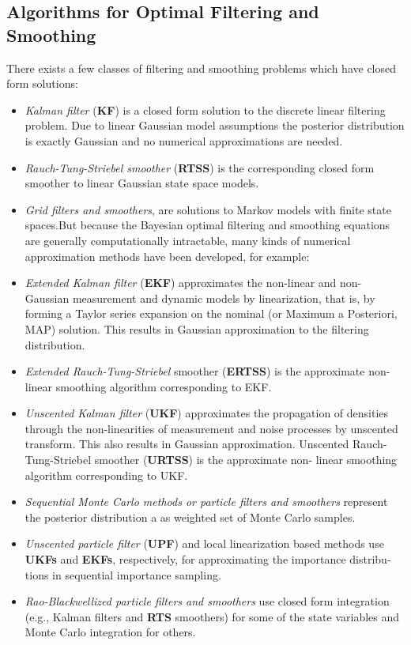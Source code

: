 \documentclass[10pt]{llncs}
\begin{document}
\subsection{Algorithms for Optimal Filtering and Smoothing}
There exists a few classes of filtering and smoothing problems which have closed
form solutions:
\begin{itemize}
\item \textit{Kalman filter} (\textbf{KF}) is a closed form solution to the discrete linear filtering problem. Due to linear Gaussian model assumptions the posterior distribution is exactly Gaussian and no numerical approximations are needed.
\item \textit{Rauch-Tung-Striebel smoother} (\textbf{RTSS}) is the corresponding closed form smoother
to linear Gaussian state space models.
\item \textit{Grid filters and smoothers}, are solutions to Markov models with finite state
spaces.But because the Bayesian optimal filtering and smoothing equations are generally
computationally intractable, many kinds of numerical approximation methods have
been developed, for example:
\item \textit{Extended Kalman filter} (\textbf{EKF}) approximates the non-linear and non-Gaussian
measurement and dynamic models by linearization, that is, by forming a
Taylor series expansion on the nominal (or Maximum a Posteriori, MAP)
solution. This results in Gaussian approximation to the filtering distribution.
\item \textit{Extended Rauch-Tung-Striebel} smoother (\textbf{ERTSS}) is the approximate non-
linear smoothing algorithm corresponding to EKF.
\item \textit{Unscented Kalman filter} (\textbf{UKF}) approximates the propagation of densities through the non-linearities of measurement and noise processes by unscented
transform. This also results in Gaussian approximation.
Unscented Rauch-Tung-Striebel smoother (\textbf{URTSS}) is the approximate non-
linear smoothing algorithm corresponding to UKF.
\item \textit{Sequential Monte Carlo methods or particle filters and smoothers} represent
the posterior distribution a as weighted set of Monte Carlo samples.
\item \textit{ Unscented particle filter} (\textbf{UPF}) and local linearization based methods use
\textbf{UKFs} and \textbf{EKFs}, respectively, for approximating the importance distribu-
tions in sequential importance sampling.
\item \textit{ Rao-Blackwellized particle filters and smoothers} use closed form integration (e.g., Kalman filters and \textbf{RTS} smoothers) for some of the state variables and Monte Carlo integration for others.

\end{itemize}
\end{document}
